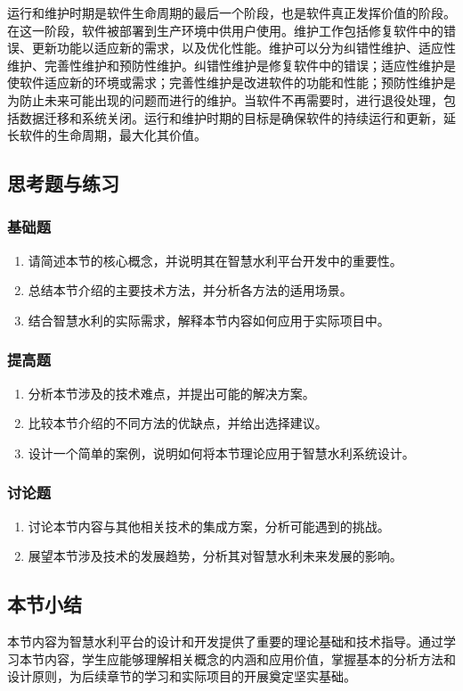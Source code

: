 运行和维护时期是软件生命周期的最后一个阶段，也是软件真正发挥价值的阶段。在这一阶段，软件被部署到生产环境中供用户使用。维护工作包括修复软件中的错误、更新功能以适应新的需求，以及优化性能。维护可以分为纠错性维护、适应性维护、完善性维护和预防性维护。纠错性维护是修复软件中的错误；适应性维护是使软件适应新的环境或需求；完善性维护是改进软件的功能和性能；预防性维护是为防止未来可能出现的问题而进行的维护。当软件不再需要时，进行退役处理，包括数据迁移和系统关闭。运行和维护时期的目标是确保软件的持续运行和更新，延长软件的生命周期，最大化其价值。 \subsection{思考题与练习}\label{ux601dux8003ux9898ux4e0eux7ec3ux4e60} \subsubsection{基础题}\label{ux57faux7840ux9898} \begin{enumerate} \def\labelenumi{\arabic{enumi}.} \item 请简述本节的核心概念，并说明其在智慧水利平台开发中的重要性。 \item 总结本节介绍的主要技术方法，并分析各方法的适用场景。 \item 结合智慧水利的实际需求，解释本节内容如何应用于实际项目中。 \end{enumerate} \subsubsection{提高题}\label{ux63d0ux9ad8ux9898} \begin{enumerate} \def\labelenumi{\arabic{enumi}.} \setcounter{enumi}{3} \item 分析本节涉及的技术难点，并提出可能的解决方案。 \item 比较本节介绍的不同方法的优缺点，并给出选择建议。 \item 设计一个简单的案例，说明如何将本节理论应用于智慧水利系统设计。 \end{enumerate} \subsubsection{讨论题}\label{ux8ba8ux8bbaux9898} \begin{enumerate} \def\labelenumi{\arabic{enumi}.} \setcounter{enumi}{6} \item 讨论本节内容与其他相关技术的集成方案，分析可能遇到的挑战。 \item 展望本节涉及技术的发展趋势，分析其对智慧水利未来发展的影响。 \end{enumerate} \subsection{本节小结}\label{ux672cux8282ux5c0fux7ed3} 本节内容为智慧水利平台的设计和开发提供了重要的理论基础和技术指导。通过学习本节内容，学生应能够理解相关概念的内涵和应用价值，掌握基本的分析方法和设计原则，为后续章节的学习和实际项目的开展奠定坚实基础。

